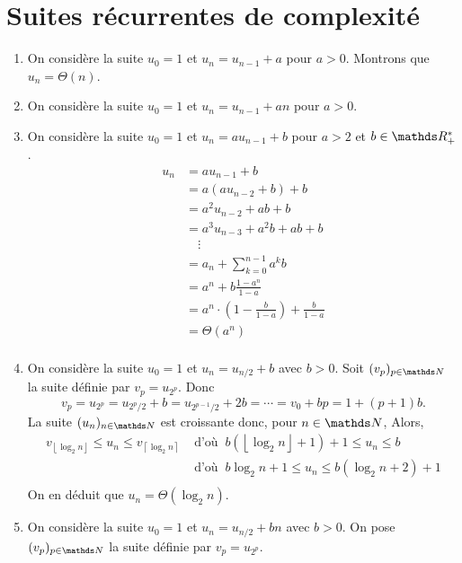 \section{Suites récurrentes de complexité}

\begin{enumerate}[label=(\textit{\alph*})]
	\item On considère la suite $u_0 = 1$ et $u_n = u_{n-1} + a$ pour $a > 0$.
		Montrons que $u_n = \Theta(n)$.
	\item On considère la suite $u_0 = 1$ et $u_n = u_{n-1} + an$ pour $a > 0$.
	\item On considère la suite $u_0 = 1$ et $u_n = a u_{n-1} + b$ pour $a > 2$ et $b \in \R_+^*$.
		\begin{align*}
			u_n &= a u_{n-1} + b\\
			&= a(a u_{n-2} + b) + b \\
			&= a^2 u_{n-2} + ab + b \\
			&= a^3 u_{n-3} + a^2b + ab + b\\
			&\quad\vdots \\
			&= a_n + \sum_{k=0}^{n-1} a^k b \\
			&= a^n + b \frac{1-a^n}{1-a} \\
			&= a^n \cdot \left( 1 - \frac{b}{1-a} \right) + \frac{b}{1-a} \\
			&= \Theta(a^n) \\
		\end{align*}
	\item On considère la suite $u_0 = 1$ et $u_n = u_{n / 2} + b$ avec $b > 0$.
		Soit $(v_p)_{p\in\N}$\/ la suite définie par $v_p = u_{2^p}$.
		Donc
		\[
			v_p = u_{2^p} = u_{2^p / 2} + b = u_{2^{p-1} / 2} + 2b = \cdots = v_0 + bp = 1 + (p+1) b
		.\]
		La suite $(u_n)_{n\in\N}$\/ est croissante donc, pour $n \in \N$,
		Alors,
		\begin{align*}
			v_{\left\lfloor \log_2 n \right\rfloor} \le u_n \le v_{\left\lceil \log_2 n \right\rceil}
			& \text{ d'où }\ 
			b(\left\lfloor \log_2 n \right\rfloor + 1) + 1 \le u_n \le b\\
			& \text{ d'où }\ 
			b \log_2 n + 1 \le u_n \le b(\log_2 n + 2) + 1\\
		\end{align*}
		On en déduit que $u_n = \Theta(\log_2 n)$.
	\item On considère la suite $u_0 = 1$ et $u_n = u_{n / 2} + bn$ avec $b > 0$. On pose $(v_p)_{p\in\N}$ la suite définie par $v_p = u_{2^p}$.
		\begin{align*}

\end{align*}
\end{enumerate}
